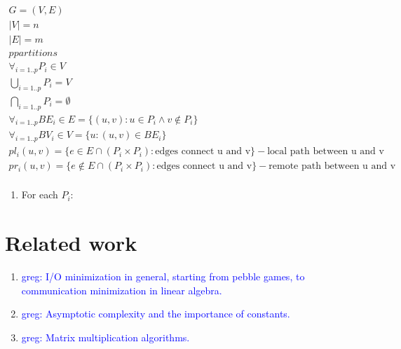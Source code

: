 \documentclass[sigconf]{acmart}
\newcommand\greg[1]{\textcolor{blue}{greg: #1}}
\begin{document}
\begin{multline}
\\
G = (V,E) \\
|V| = n \\
|E| = m \\
p partitions \\
\forall_{i = 1..p} P_i \in V \\
\bigcup_{i = 1..p} P_i = V \\
\bigcap_{i = 1..p} P_i = \emptyset \\
\forall_{i = 1..p} BE_i \in E = \{(u,v) : u \in P_i \land v \notin P_i\} \\
\forall_{i = 1..p} BV_i \in V = \{u : (u,v) \in BE_i\} \\
pl_i(u,v) = \{e \in E \cap (P_i \times P_i) : \text{edges connect u and v} \} - 
\text{local path between u and v} \\
pr_i(u,v) = \{e \notin E \cap (P_i \times P_i) : \text{edges connect u and v} 
\} - \text{remote path between u and v} \\
\end{multline}
\begin{enumerate}
	\item For each $P_i$:
\end{enumerate}

\section{Related work}
\begin{enumerate}
	\item \greg{I/O minimization in general, starting from pebble games, to 
	communication minimization in linear algebra.}
	\item \greg{Asymptotic complexity and the importance of constants.}
	\item \greg{Matrix multiplication algorithms.}
\end{enumerate}
\end{document}
